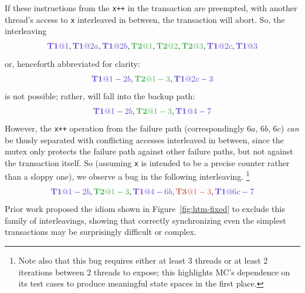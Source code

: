 \documentclass[10pt]{sigplanconf}
\begin{document}
\newcommand\tiat[1]{\ensuremath{\hilight{lavender}{\mathbf{T1}@#1}}\xspace}
\newcommand\tjat[1]{\ensuremath{\hilight{seafoam}{\mathbf{T2}@#1}}\xspace}
\newcommand\tkat[1]{\ensuremath{\hilight{salmon}{\mathbf{T3}@#1}}\xspace}

If these instructions from the {\tt x++} in the transaction are preempted,
with another thread's access to {\tt x} interleaved in between,
the transaction will abort.
So, the interleaving
\[
	\tiat{1}, \tiat{2a}, \tiat{2b}, \tjat{1}, \tjat{2}, \tjat{3}, \tiat{2c}, \tiat{3}
\]
or, henceforth abbreviated for clarity:
\[
	\tiat{1-2b}, \tjat{1-3}, \tiat{2c-3}
\]
is not possible; rather, \ti will fall into the backup path:
\[
	\tiat{1-2b}, \tjat{1-3}, \tiat{4-7}
\]
However, the {\tt x++} operation from the failure path (correspondingly $6a$, $6b$, $6c$)
{\em can} be thusly separated with conflicting accesses interleaved in between,
since the mutex only protects the failure path against other failure paths,
but not against the transaction itself.
So (assuming {\tt x} is intended to be a precise counter rather than a sloppy one),
we observe a bug in the following interleaving.%
\footnote{Note also that this bug requires either at least 3 threads or at least 2 iterations between 2 threads to expose;
this highlights MC's dependence on its test cases to produce meaningful state spaces in the first place.}
\[
	\tiat{1-2b}, \tjat{1-3}, \tiat{4-6b}, \tkat{1-3}, \tiat{6c-7}
\]
Prior work \cite{htm-mario} proposed the idiom shown in Figure~\ref{fig:htm-fixed}
to exclude this family of interleavings,
showing that correctly synchronizing even the simplest transactions may be surprisingly difficult or complex.
\end{document}
